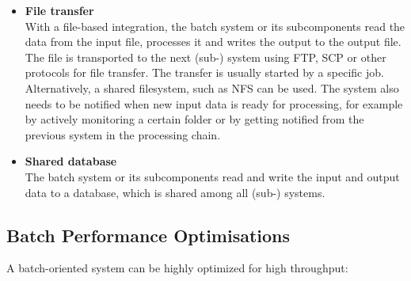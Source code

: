 \begin{itemize}
	\item \textbf{File transfer}\\
	With a file-based integration, the batch system or its subcomponents read the data from the input file, processes it and writes the output to the output file.
The file is transported to the next (sub-) system using \ac{FTP}, \ac{SCP} or other protocols for file transfer. The transfer is usually started by a specific job. Alternatively, a shared filesystem, such as \ac{NFS} can be used. The system also needs to be notified when new input data is ready for processing, for example by actively monitoring a certain folder or by getting notified from the previous system in the processing chain.
	\item \textbf{Shared database}\\
	The batch system or its subcomponents read and write the input and output data to a database, which is shared among all (sub-) systems. 
\end{itemize}

\subsection{Batch Performance Optimisations}

A batch-oriented system can be highly optimized for high throughput:

